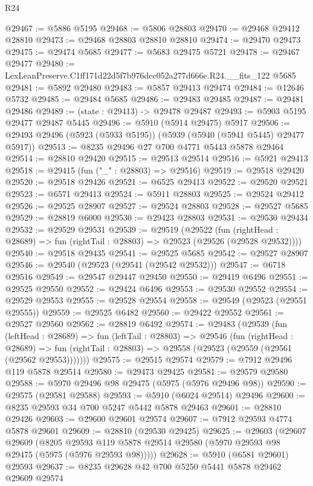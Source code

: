 \begin{lexlean}{R24}
\begin{coremodule}
@29467 := @5886 @5195
@29468 := @5806 @28803
@29470 := @29468 @29412 @28810
@29473 := @29468 @28803 @28810 @28810
@29474 := @29470 @29473
@29475 := @29474 @5685
@29477 := @5683 @29475 @5721
@29478 := @29467 @29477
@29480 := LexLeanPreserve.C1ff171d22d5f7b976dcc052a277d666e.R24.__fits_122 @5685
@29481 := @5892 @29480
@29483 := @5857 @29413 @29474
@29484 := @12646 @5732
@29485 := @29484 @5685
@29486 := @29483 @29485
@29487 := @29481 @29486
@29489 := (state : @29413) -> @29478 @29487
@29493 := @5903 @5195 @29477 @29487 @5445
@29496 := @5910 (@5914 @29475) @5917
@29506 := @29493 @29496 (@5923 (@5933 @5195)) (@5939 (@5940 (@5941 @5445) @29477 @5917))
@29513 := @8235 @29496 @27 @700 @4771 @5443 @5878 @29464
@29514 := @28810 @29420
@29515 := @29513 @29514
@29516 := @5921 @29413
@29518 := @29415 (fun ("_" : @28803) => @29516)
@29519 := @29518 @29420
@29520 := @29518 @29426
@29521 := @6525 @29413
@29522 := @29520 @29521
@29523 := @6571 @29413
@29524 := @5911 @28803
@29525 := @29524 @29412
@29526 := @29525 @28907
@29527 := @29524 @28803
@29528 := @29527 @5685
@29529 := @28819 @6000
@29530 := @29423 @28803
@29531 := @29530 @29434
@29532 := @29529 @29531
@29539 := @29519
    (@29522
      (fun (rightHead : @28689) => fun (rightTail : @28803) => @29523 (@29526 (@29528 @29532))))
@29540 := @29518 @29435
@29541 := @29525 @5685
@29542 := @29527 @28907
@29546 := @29540 (@29523 (@29541 (@29542 @29532)))
@29547 := @6718 @29516
@29549 := @29547 @29447 @29450
@29550 := @29419 @6496
@29551 := @29525 @29550
@29552 := @29424 @6496
@29553 := @29530 @29552
@29554 := @29529 @29553
@29555 := @29528 @29554
@29558 := @29549 (@29523 (@29551 @29555))
@29559 := @29525 @6482
@29560 := @29422 @29552
@29561 := @29527 @29560
@29562 := @28819 @6492
@29574 := @29483
    (@29539
      (fun (leftHead : @28689) =>
      fun (leftTail : @28803) =>
      @29546
        (fun (rightHead : @28689) =>
        fun (rightTail : @28803) => @29558 (@29523 (@29559 (@29561 (@29562 @29553)))))))
@29575 := @29515 @29574
@29579 := @7912 @29496 @119 @5878 @29514
@29580 := @29473 @29425
@29581 := @29579 @29580
@29588 := @5970 @29496 @98 @29475 (@5975 (@5976 @29496 @98))
@29590 := @29575 (@29581 @29588)
@29593 := @5910 (@6024 @29514) @29496
@29600 := @8235 @29593 @34 @700 @5247 @5442 @5878 @29463
@29601 := @28810 @29426
@29603 := @29600 @29601 @29574
@29607 := @7912 @29593 @4774 @5878 @29601
@29609 := @28810 (@29530 @29425)
@29625 := @29603
    (@29607
      @29609
      (@8205 @29593 @119 @5878 @29514 @29580 (@5970 @29593 @98 @29475 (@5975 (@5976 @29593 @98)))))
@29628 := @5910 (@6581 @29601) @29593
@29637 := @8235 @29628 @42 @700 @5250 @5441 @5878 @29462 @29609 @29574

\end{coremodule}
\end{lexlean}
